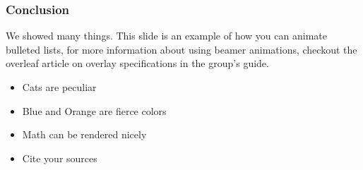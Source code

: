 \begin{frame}
  \frametitle{Conclusion}
        We showed many things. This slide is an example of how 
        you can animate bulleted lists, for more information about
        using beamer animations, checkout the overleaf article on 
        overlay specifications in the group's guide.
        \begin{itemize}
                \item Cats are peculiar
                \pause
                \item Blue and Orange are fierce colors
                \pause
                \item Math can be rendered nicely
                \pause
                \item Cite your sources
        \end{itemize}
\end{frame}
